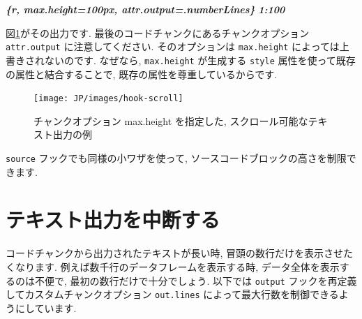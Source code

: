\documentclass[
  11pt,
  lualatex,ja=standard,jafont=noto]{bxjsreport}
\newenvironment{Shaded}{\begin{snugshade}}{\end{snugshade}}
\newcommand{\FunctionTok}[1]{\textcolor[rgb]{0.00,0.00,0.00}{#1}}
\newcommand{\InformationTok}[1]{\textcolor[rgb]{0.56,0.35,0.01}{\textbf{\textit{#1}}}}
\newcommand{\NormalTok}[1]{#1}
\newcommand{\OtherTok}[1]{\textcolor[rgb]{0.56,0.35,0.01}{#1}}
\newcommand{\SpecialCharTok}[1]{\textcolor[rgb]{0.00,0.00,0.00}{#1}}
\newcommand{\StringTok}[1]{\textcolor[rgb]{0.31,0.60,0.02}{#1}}
\begin{document}
\begin{Shaded}
\begin{Highlighting}[]
\InformationTok{\textasciigrave{}\textasciigrave{}\textasciigrave{}\{r, max.height=\textquotesingle{}100px\textquotesingle{}, attr.output=\textquotesingle{}.numberLines\textquotesingle{}\}}
\InformationTok{1:100}
\InformationTok{\textasciigrave{}\textasciigrave{}\textasciigrave{}}
\end{Highlighting}
\end{Shaded}

図\ref{fig:hook-scroll}がその出力です. 最後のコードチャンクにあるチャンクオプション \texttt{attr.output} に注意してください. そのオプションは \texttt{max.height} によっては上書きされないのです. なぜなら, \texttt{max.height} が生成する \texttt{style} 属性を使って既存の属性と結合することで, 既存の属性を尊重しているからです.

\begin{Shaded}
\end{Shaded}

\begin{figure}

{\centering \texttt{[image: JP/images/hook-scroll]} 

}

\caption{チャンクオプション max.height を指定した, スクロール可能なテキスト出力の例}\label{fig:hook-scroll}
\end{figure}

\texttt{source} フックでも同様の小ワザを使って, ソースコードブロックの高さを制限できます.

\hypertarget{hook-truncate}{%
\section{テキスト出力を中断する}\label{hook-truncate}}

コードチャンクから出力されたテキストが長い時, 冒頭の数行だけを表示させたくなります. 例えば数千行のデータフレームを表示する時, データ全体を表示するのは不便で, 最初の数行だけで十分でしょう. 以下では \texttt{output} フックを再定義してカスタムチャンクオプション \texttt{out.lines} によって最大行数を制御できるようにしています.
\end{document}
